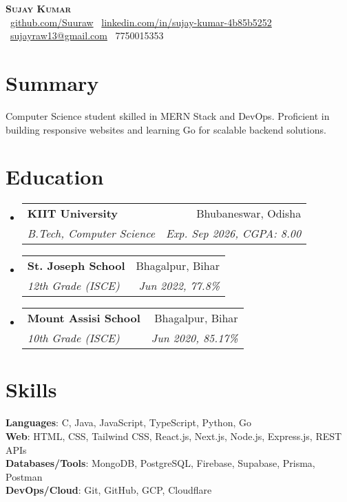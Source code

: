 \documentclass[letterpaper,10pt]{article}
\makeatletter
\newcommand{\resumeSubheading}[4]{
  \vspace{-3pt}\item
  \begin{tabular*}{0.98\textwidth}[t]{l@{\extracolsep{\fill}}r}
    \textbf{#1} & #2 \\
    \textit{\small#3} & \textit{\small #4} \\
  \end{tabular*}\vspace{-6pt}
}
\newcommand{\resumeSubHeadingListStart}{\begin{itemize}[leftmargin=0.1in, label={}]}
\newcommand{\resumeSubHeadingListEnd}{\end{itemize}}
\makeatother
\begin{document}
\begin{center}
  \textbf{\Huge \scshape Sujay Kumar} \\ \vspace{8pt}
  \small
  \faGithub\ \href{https://github.com/Suuraw}{github.com/Suuraw} \quad
  \faLinkedin\ \href{https://linkedin.com/in/sujay-kumar-4b85b5252}{linkedin.com/in/sujay-kumar-4b85b5252} \quad
  \faEnvelope\ \href{mailto:sujayraw13@gmail.com}{sujayraw13@gmail.com} \quad
  \faPhone\ 7750015353
\end{center}

\section{Summary}
\resumeSubHeadingListStart
  \small{\item{Computer Science student skilled in MERN Stack and DevOps. Proficient in building responsive websites and learning Go for scalable backend solutions.}}
\resumeSubHeadingListEnd

\section{Education}
\resumeSubHeadingListStart
  \resumeSubheading{KIIT University}{Bhubaneswar, Odisha}{B.Tech, Computer Science}{Exp. Sep 2026, CGPA: 8.00}
  \resumeSubheading{St. Joseph School}{Bhagalpur, Bihar}{12th Grade (ISCE)}{Jun 2022, 77.8\%}
  \resumeSubheading{Mount Assisi School}{Bhagalpur, Bihar}{10th Grade (ISCE)}{Jun 2020, 85.17\%}
\resumeSubHeadingListEnd

\section{Skills}
\resumeSubHeadingListStart
  \small{\item{
    \textbf{Languages}: C, Java, JavaScript, TypeScript, Python, Go \\
    \textbf{Web}: HTML, CSS, Tailwind CSS, React.js, Next.js, Node.js, Express.js, REST APIs \\
    \textbf{Databases/Tools}: MongoDB, PostgreSQL, Firebase, Supabase, Prisma, Postman \\
    \textbf{DevOps/Cloud}: Git, GitHub, GCP, Cloudflare
  }}
\resumeSubHeadingListEnd

\end{document}
